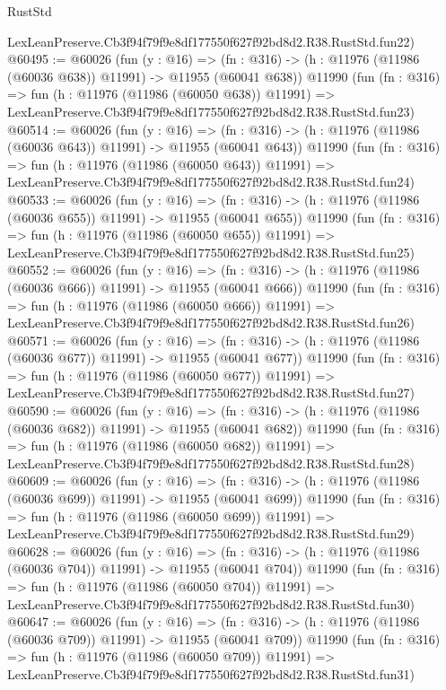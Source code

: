\begin{lexlean}{RustStd}
\begin{coremodule}
    LexLeanPreserve.Cb3f94f79f9e8df177550f627f92bd8d2.R38.RustStd.fun22)
@60495 := @60026
    (fun (y : @16) =>
    (fn : @316) -> (h : @11976 (@11986 (@60036 @638)) @11991) -> @11955 (@60041 @638))
    @11990
    (fun (fn : @316) =>
    fun (h : @11976 (@11986 (@60050 @638)) @11991) =>
    LexLeanPreserve.Cb3f94f79f9e8df177550f627f92bd8d2.R38.RustStd.fun23)
@60514 := @60026
    (fun (y : @16) =>
    (fn : @316) -> (h : @11976 (@11986 (@60036 @643)) @11991) -> @11955 (@60041 @643))
    @11990
    (fun (fn : @316) =>
    fun (h : @11976 (@11986 (@60050 @643)) @11991) =>
    LexLeanPreserve.Cb3f94f79f9e8df177550f627f92bd8d2.R38.RustStd.fun24)
@60533 := @60026
    (fun (y : @16) =>
    (fn : @316) -> (h : @11976 (@11986 (@60036 @655)) @11991) -> @11955 (@60041 @655))
    @11990
    (fun (fn : @316) =>
    fun (h : @11976 (@11986 (@60050 @655)) @11991) =>
    LexLeanPreserve.Cb3f94f79f9e8df177550f627f92bd8d2.R38.RustStd.fun25)
@60552 := @60026
    (fun (y : @16) =>
    (fn : @316) -> (h : @11976 (@11986 (@60036 @666)) @11991) -> @11955 (@60041 @666))
    @11990
    (fun (fn : @316) =>
    fun (h : @11976 (@11986 (@60050 @666)) @11991) =>
    LexLeanPreserve.Cb3f94f79f9e8df177550f627f92bd8d2.R38.RustStd.fun26)
@60571 := @60026
    (fun (y : @16) =>
    (fn : @316) -> (h : @11976 (@11986 (@60036 @677)) @11991) -> @11955 (@60041 @677))
    @11990
    (fun (fn : @316) =>
    fun (h : @11976 (@11986 (@60050 @677)) @11991) =>
    LexLeanPreserve.Cb3f94f79f9e8df177550f627f92bd8d2.R38.RustStd.fun27)
@60590 := @60026
    (fun (y : @16) =>
    (fn : @316) -> (h : @11976 (@11986 (@60036 @682)) @11991) -> @11955 (@60041 @682))
    @11990
    (fun (fn : @316) =>
    fun (h : @11976 (@11986 (@60050 @682)) @11991) =>
    LexLeanPreserve.Cb3f94f79f9e8df177550f627f92bd8d2.R38.RustStd.fun28)
@60609 := @60026
    (fun (y : @16) =>
    (fn : @316) -> (h : @11976 (@11986 (@60036 @699)) @11991) -> @11955 (@60041 @699))
    @11990
    (fun (fn : @316) =>
    fun (h : @11976 (@11986 (@60050 @699)) @11991) =>
    LexLeanPreserve.Cb3f94f79f9e8df177550f627f92bd8d2.R38.RustStd.fun29)
@60628 := @60026
    (fun (y : @16) =>
    (fn : @316) -> (h : @11976 (@11986 (@60036 @704)) @11991) -> @11955 (@60041 @704))
    @11990
    (fun (fn : @316) =>
    fun (h : @11976 (@11986 (@60050 @704)) @11991) =>
    LexLeanPreserve.Cb3f94f79f9e8df177550f627f92bd8d2.R38.RustStd.fun30)
@60647 := @60026
    (fun (y : @16) =>
    (fn : @316) -> (h : @11976 (@11986 (@60036 @709)) @11991) -> @11955 (@60041 @709))
    @11990
    (fun (fn : @316) =>
    fun (h : @11976 (@11986 (@60050 @709)) @11991) =>
    LexLeanPreserve.Cb3f94f79f9e8df177550f627f92bd8d2.R38.RustStd.fun31)

\end{coremodule}
\end{lexlean}
